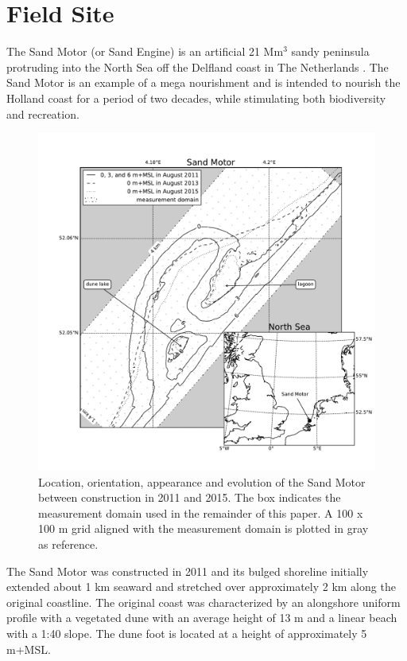 \section{Field Site}
\label{sec:fieldsite}

The Sand Motor (or Sand Engine) is an artificial 21 $\mathrm{Mm^3}$
sandy peninsula protruding into the North Sea off the Delfland coast
in The Netherlands \citep[Figure
\ref{fig:fieldsite},][]{Stive2013}. The Sand Motor is an example of a
mega nourishment and is intended to nourish the Holland coast for a
period of two decades, while stimulating both biodiversity and
recreation.

\begin{figure}
  \centering
  \includegraphics[width=\columnwidth]{../Figures/location_and_evolution}
  \caption{Location, orientation, appearance and evolution of the Sand
    Motor between construction in 2011 and 2015. The box indicates the
    measurement domain used in the remainder of this paper. A 100 x
    100 m grid aligned with the measurement domain is plotted in gray
    as reference.}
  \label{fig:fieldsite}
\end{figure}

The Sand Motor was constructed in 2011 and its bulged shoreline
initially extended about 1 km seaward and stretched over approximately
2 km along the original coastline. The original coast was
characterized by an alongshore uniform profile with a vegetated dune
with an average height of 13 m and a linear beach with a 1:40
slope. The dune foot is located at a height of approximately 5 m+MSL.

